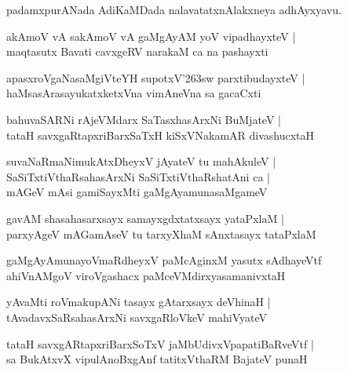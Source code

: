 \documentclass[twoside,12pt,openright]{book}
\def\S{\char'263}
\newcounter{shloka}[chapter]
\begin{document}
\begin{center}
padamxpurANada AdiKaMDada nalavatatxnAlakxneya adhAyxyavu.
\end{center}

\begin{shloka}
akAmoV vA sakAmoV vA gaMgAyAM yoV vipadhayxteV |\\
maqtasutx Bavati cavxgeRV narakaM ca na pashayxti 
\end{shloka}

\begin{shloka}
apasxroVgaNasaMgiVteYH supotxV\S sw parxtibudayxteV |\\
haMsasArasayukatxketxVna vimAneVna sa gacaCxti 
\end{shloka}

\begin{shloka}
bahuvaSARNi rAjeVMdarx SaTasxhasArxNi BuMjateV |\\
tataH savxgaRtapxriBarxSaTxH kiSxVNakamAR divashucxtaH 
\end{shloka}

\begin{shloka}
suvaNaRmaNimukAtxDheyxV jAyateV tu mahAkuleV |\\
SaSiTxtiVthaRsahasArxNi SaSiTxtiVthaRshatAni ca |\\
mAGeV mAsi gamiSayxMti gaMgAyamunasaMgameV 
\end{shloka}

\begin{shloka}
gavAM shasahasarxsayx samayxgdxtatxsayx yataPxlaM |\\
parxyAgeV mAGamAseV tu tarxyXhaM sAnxtasayx tataPxlaM
\end{shloka}

\begin{shloka}
gaMgAyAmunayoVmaRdheyxV paMcAginxM yasutx sAdhayeVtf \\
ahiVnAMgoV viroVgashacx paMceVMdirxyasamanivxtaH 
\end{shloka}

\begin{shloka}
yAvaMti roVmakupANi tasayx gAtarxsayx deVhinaH |\\
tAvadavxSaRsahasArxNi savxgaRloVkeV mahiVyateV 
\end{shloka}

\begin{shloka}
tataH savxgARtapxriBarxSoTxV jaMbUdivxVpapatiBaRveVtf |\\
sa BukAtxvX vipulAnoBxgAnf tatitxVthaRM BajateV punaH 
\end{shloka}
\end{document}
